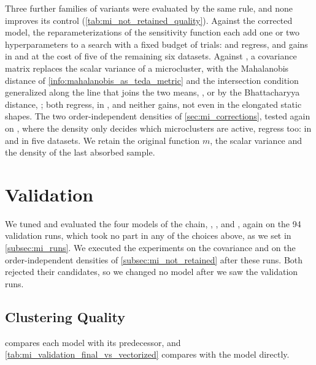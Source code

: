 Three further families of variants were evaluated by the same rule, and none improves its control (\cref{tab:mi_not_retained_quality}). Against the corrected model, the reparameterizations of the sensitivity function each add one or two hyperparameters to a search with a fixed budget of trials:  and  regress, and  gains in \BenchmarkOne and \BenchmarkTwo at the cost of five of the remaining six datasets. Against \MicroTEDAClusPlus, a covariance matrix replaces the scalar variance of a microcluster, with the Mahalanobis distance of \cref{info:mahalanobis_as_teda_metric} and the intersection condition generalized along the line that joins the two means, , or by the Bhattacharyya distance, ; both regress, in \BenchmarkTwo, and neither gains, not even in the elongated static shapes. The two order-independent densities of \cref{sec:mi_corrections}, tested again on \MicroTEDAClusPlus, where the density only decides which microclusters are active, regress too:  in \ChameleonDSThree and  in five datasets. We retain the original function $m$, the scalar variance and the density of the last absorbed sample.



\section{Validation}
\label{sec:mi_validation}

We tuned and evaluated the four models of the chain, , ,  and \MicroTEDAClusPlus, again on the 94 validation runs, which took no part in any of the choices above, as we set in \cref{subsec:mi_runs}. We executed the experiments on the covariance and on the order-independent densities of \cref{subsec:mi_not_retained} after these runs. Both rejected their candidates, so we changed no model after we saw the validation runs.

\subsection{Clustering Quality}
\label{subsec:mi_validation_quality}

 compares each model with its predecessor, and \cref{tab:mi_validation_final_vs_vectorized} compares \MicroTEDAClusPlus with the  model directly.

